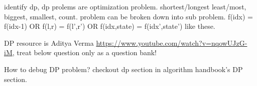 {\begin{exercise}
\begin{compactenum}
    \item identify dp, dp prolems are optimization problem. shortest/longest least/most, biggest, smallest, count. problem can be broken down into sub problem. f(idx) = f(idx-1) OR f(l,r) = f(l',r') OR f(idx,state) = f(idx',state') like these.
    
    \item DP resource is Aditya Verma \href{link}{https://www.youtube.com/watch?v=nqowUJzG-iM}, treat below question only as a question bank! 
    \item How to debug DP problem? checkout dp section in algorithm handbook's DP section.
\end{compactenum}



\end{exercise}
}